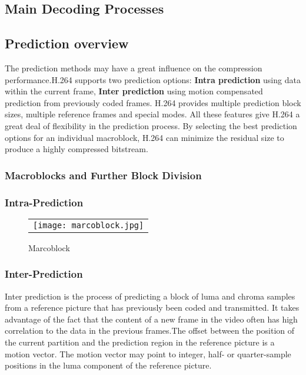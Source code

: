 \documentclass[../main.tex]{subfiles}
\begin{document}
\subsection{ Main Decoding Processes }



\subsection{Prediction overview}

The prediction methods may have a great influence on the compression performance.H.264 supports two prediction options: \textbf{Intra prediction} using data within
the current frame, \textbf{Inter prediction} using motion compensated prediction from previously
coded frames. H.264 provides multiple prediction block sizes, multiple reference frames and special modes. All these features give H.264 a great deal of flexibility in the prediction process. By selecting the best prediction options for an individual macroblock, H.264 can minimize the residual size to produce a highly compressed bitstream.

\subsubsection{ Macroblocks and Further Block Division }

\subsubsection{ Intra-Prediction }


   \begin{figure} [ht]
   \begin{center}
   \begin{tabular}{c} %
   \texttt{[image: marcoblock.jpg]}
   \end{tabular}
   \end{center}
   \caption[example] 
   { \label{fig:example} 
Marcoblock}
   \end{figure}     %
   
\subsubsection{ Inter-Prediction }

Inter prediction is the process of predicting
a block of luma and chroma samples from a reference picture that has
previously been coded and transmitted. It
takes advantage of the fact that the content of a new frame in
the video often has high correlation to the data in the
previous frames.The offset between the position of the current partition and the prediction
region in the reference picture is a motion vector. The motion vector may point to integer,
half- or quarter-sample positions in the luma component of the reference picture. 
\end{document}
